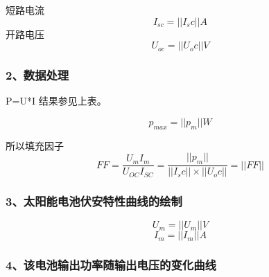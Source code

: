         短路电流$${I}_{sc}= ||I_sc|| A$$ 开路电压$${U}_{oc} = ||U_oc||V$$

        \subsubsection*{2、数据处理}

        P=U*I 结果参见上表。

        $${p}_{max} = ||p_m|| W$$

        所以填充因子$$FF=\frac{{U}_{m}{I}_{m}}{{U}_{OC}{I}_{SC}}=\frac{ ||p_m|| }{ ||I_sc|| \times ||U_oc|| } = ||FF||$$

        \subsubsection*{3、太阳能电池伏安特性曲线的绘制}
        $${U}_{m} = ||U_m|| V$$
        $${I}_{m} = ||I_m|| A$$

        \subsubsection*{4、该电池输出功率随输出电压的变化曲线}
